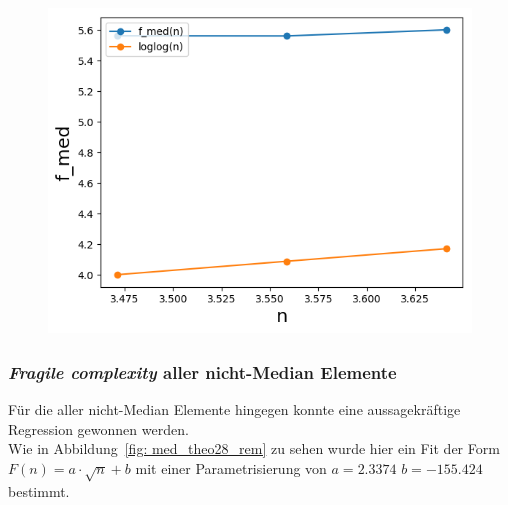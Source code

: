 \begin{figure}[H]
\begin{minipage}[t]{.30\textwidth}
        \includegraphics[width=\textwidth]{pictures/med_algo_theo28_med_logscale.png}
    \end{minipage}
    \vspace*{-0.1cm}
    \label{fig: med_theo28_med}
\end{figure}


\noindent

\subsubsection*{\textit{Fragile complexity} aller nicht-Median Elemente}
Für die \fg aller nicht-Median Elemente \fgr hingegen konnte eine aussagekräftige Regression gewonnen werden.\\[.05cm]
Wie in Abbildung~\ref{fig: med_theo28_rem} zu sehen wurde hier ein Fit der Form $F(n)= a \cdot \sqrt{n} + b$ mit einer Parametrisierung von $a=2.3374$  $b=-155.424$ bestimmt.


